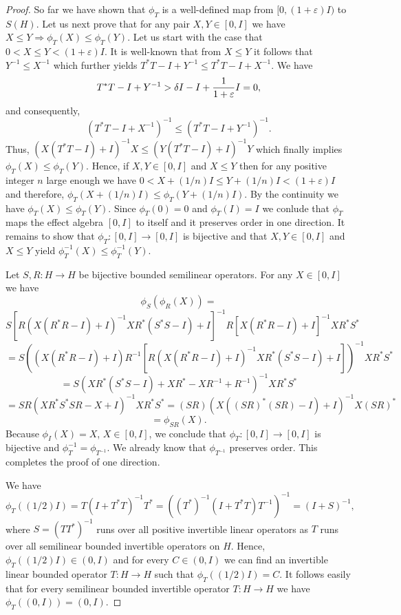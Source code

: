 \documentclass{article}
\begin{document}
\begin{proof}
So far we have shown that $\phi_T$ is a well-defined map from $[0, (1 + \varepsilon) I)$ to $S(H)$. Let us next prove that for any pair $X,Y \in [0,I]$ we have $X \le Y \Rightarrow \phi_T (X) \le \phi_T (Y)$. Let us start with the case that $0 < X \le Y < (1+\varepsilon) I$. It is well-known that from $X \le Y$ it follows that $Y^{-1} \le X^{-1}$ which further yields $T^\ast T - I + Y^{-1} \le T^\ast T - I + X^{-1}$. We have
$$
T^\ast T - I + Y^{-1} > \delta I - I + {1 \over 1+ \varepsilon} I = 0, 
$$
and consequently,   
$$
\left(  T^\ast T - I + X^{-1} \right)^{-1} \le \left(  T^\ast T - I + Y^{-1} \right)^{-1}.
$$
Thus, $ (X (  T^\ast T - I )+I)^{-1}X \le  (Y (  T^\ast T - I )+I)^{-1}Y$ which finally implies $\phi_T(X) \le \phi_T (Y)$. Hence, if $X,Y \in [0,I]$ and $X  \le Y$ then for any positive integer $n$ large enough we have 
$0 < X + (1/n) I \le Y + (1/n) I < (1+\varepsilon) I$ and therefore, $\phi_T(X + (1/n)I) \le \phi_T (Y + (1/n)I)$. By the continuity we have $\phi_T(X) \le \phi_T (Y)$. Since $\phi_T (0) = 0$ and $\phi_T (I) = I$ we conlude that $\phi_T$ maps the effect algebra $[0,I]$ to itself and it preserves order in one direction. It remains to show that $\phi_T : [0,I] \to [0,I]$ is bijective and that $X,Y \in [0,I]$ and $X \le Y$
yield $\phi_T^{-1} (X) \le \phi_T^{-1} (Y)$.

Let $S,R : H \to H$ be bijective bounded semilinear operators. For any $X \in [0,I]$ we have
$$
\phi_S ( \phi_R (X)) = $$ $$S \left[ R ( X(R^\ast R -I) + I)^{-1} XR^\ast (S^\ast S - I) + I \right]^{-1} R [ X(R^\ast R -I) + I]^{-1} XR^\ast S^\ast
$$
$$
=S \left(       ( X(R^\ast R -I) + I) R^{-1} \left[     R ( X(R^\ast R -I) + I)^{-1} XR^\ast (S^\ast S - I) + I \right]     \right)^{-1} XR^\ast S^\ast
$$
$$
= S \left( XR^\ast (S^\ast S - I) + XR^\ast - XR^{-1} + R^{-1} \right)^{-1} XR^\ast S^\ast
 $$
$$
= SR (XR^\ast S^\ast SR - X + I)^{-1} XR^\ast S^\ast = (SR)\left( X ( (SR)^\ast (SR) -I) + I \right)^{-1} X (SR)^\ast
$$
$$
= \phi_{SR} (X).
$$
Because $\phi_I (X) = X$, $X \in [0,I]$, we conclude that $\phi_T : [0,I] \to [0,I]$ is bijective and $\phi_T^{-1} = \phi_{T^{-1}}$. We already know that 
$ \phi_{T^{-1}}$ preserves order. This completes the proof of one direction.

We have
$$
\phi_T ( (1/2)I) = T (I+T^\ast T)^{-1} T^\ast = \left( (T^\ast)^{-1} (I + T^\ast T) T^{-1} \right)^{-1} = (I + S)^{-1},
$$
where $S = (TT^\ast)^{-1}$ runs over all positive invertible linear  operators as $T$ runs over all semilinear bounded invertible operators on $H$. Hence, $\phi_T ( (1/2)I) \in (0,I)$ and for every $C \in (0,I)$ we can find an invertible linear bounded operator $T: H \to H$ such that $\phi_T ( (1/2)I) = C$. It follows easily that for every semilinear bounded invertible operator $T : H \to H$ we have $\phi_T ((0,I)) = (0,I)$.


\end{proof}
\end{document}
